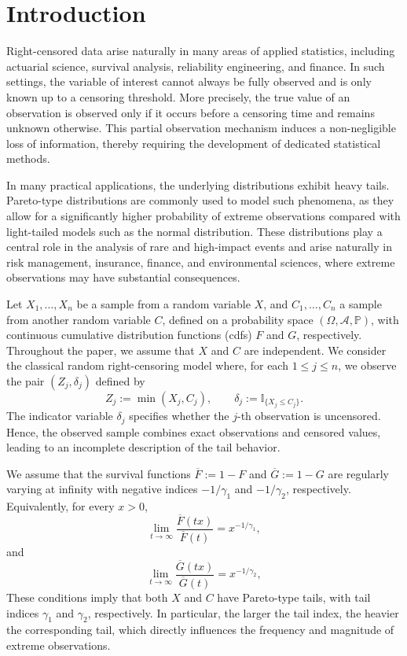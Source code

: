 \documentclass[reqno,openbib,runningheads,a4paper,12pt]{amsart}%
\begin{document}
\section{\textbf{Introduction\label{sec1}}}

\noindent Right-censored data arise naturally in many areas of applied
statistics, including actuarial science, survival analysis, reliability
engineering, and finance. In such settings, the variable of interest cannot
always be fully observed and is only known up to a censoring threshold. More
precisely, the true value of an observation is observed only if it occurs
before a censoring time and remains unknown otherwise. This partial
observation mechanism induces a non-negligible loss of information, thereby
requiring the development of dedicated statistical methods.\smallskip

\noindent In many practical applications, the underlying distributions exhibit
heavy tails. Pareto-type distributions are commonly used to model such
phenomena, as they allow for a significantly higher probability of extreme
observations compared with light-tailed models such as the normal
distribution. These distributions play a central role in the analysis of rare
and high-impact events and arise naturally in risk management, insurance,
finance, and environmental sciences, where extreme observations may have
substantial consequences.\smallskip

\noindent Let $X_{1},\ldots,X_{n}$ be a sample from a random variable $X$, and
$C_{1},\ldots,C_{n}$ a sample from another random variable $C$, defined on a
probability space $(\Omega,\mathcal{A},\mathbb{P})$, with continuous
cumulative distribution functions (cdfs) $F$ and $G$, respectively. Throughout
the paper, we assume that $X$ and $C$ are independent. We consider the
classical random right-censoring model where, for each $1\leq j\leq n$, we
observe the pair $(Z_{j},\delta_{j})$ defined by
\[
Z_{j}:=\min(X_{j},C_{j}), \qquad\delta_{j}:=\mathbb{I}_{\{X_{j}\leq C_{j}\}}.
\]
The indicator variable $\delta_{j}$ specifies whether the $j$-th observation
is uncensored. Hence, the observed sample combines exact observations and
censored values, leading to an incomplete description of the tail
behavior.\smallskip

\noindent We assume that the survival functions $\overline{F}:=1-F$ and
$\overline{G}:=1-G$ are regularly varying at infinity with negative indices
$-1/\gamma_{1}$ and $-1/\gamma_{2}$, respectively. Equivalently, for every
$x>0$,
\begin{equation}
\lim_{t\rightarrow\infty} \frac{\overline{F}(tx)}{\overline{F}(t)} =
x^{-1/\gamma_{1}}, \label{RVF}%
\end{equation}
and
\begin{equation}
\lim_{t\rightarrow\infty} \frac{\overline{G}(tx)}{\overline{G}(t)} =
x^{-1/\gamma_{2}}, \label{RVG}%
\end{equation}
These conditions imply that both $X$ and $C$ have Pareto-type tails, with tail
indices $\gamma_{1}$ and $\gamma_{2}$, respectively. In particular, the larger
the tail index, the heavier the corresponding tail, which directly influences
the frequency and magnitude of extreme observations.\smallskip
\end{document}
